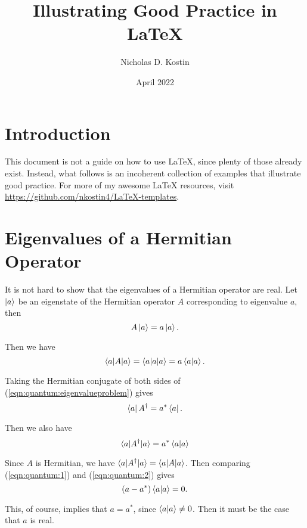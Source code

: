 \documentclass{article}
\title{Illustrating Good Practice in {\LaTeX}}
\author{Nicholas D. Kostin}
\date{April 2022}
\numberwithin{equation}{section}
\begin{document}
\maketitle

\section{Introduction}

This document is not a guide on how to use {\LaTeX}, since plenty of those already exist. Instead, what follows is an incoherent collection of examples that illustrate good practice. For more of my awesome {\LaTeX} resources, visit \url{https://github.com/nkostin4/LaTeX-templates}.

\section{Eigenvalues of a Hermitian Operator}

It is not hard to show that the eigenvalues of a Hermitian operator are real. Let $\ket{a}$ be an eigenstate of the Hermitian operator $A$ corresponding to eigenvalue $a$, then
\begin{equation}
    A \ket{a} = a \ket{a}. \label{eqn:quantum:eigenvalueproblem}
\end{equation}

Then we have
\begin{equation}
    \braket{a|A|a} = \braket{a|a|a} = a\braket{a|a}. \label{eqn:quantum:1}
\end{equation}

Taking the Hermitian conjugate of both sides of (\ref{eqn:quantum:eigenvalueproblem}) gives
\begin{equation}
    \bra{a} A^{\dagger} = a^{*} \bra{a}.
\end{equation}

Then we also have
\begin{equation}
    \braket{a|A^{\dagger}|a} = a^{*} \braket{a|a} \label{eqn:quantum:2}
\end{equation}

Since $A$ is Hermitian, we have $\braket{a|A^{\dagger}|a} = \braket{a|A|a}$. Then comparing (\ref{eqn:quantum:1}) and (\ref{eqn:quantum:2}) gives
\begin{equation*}
    \left( a - a^* \right) \braket{a|a} = 0.
\end{equation*}

This, of course, implies that $a = a^*$, since $\braket{a|a} \neq 0$. Then it must be the case that $a$ is real.
\end{document}
